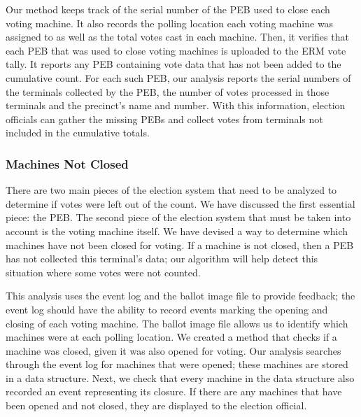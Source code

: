 Our method keeps track of the serial number of the PEB used to close each voting machine. It also records the polling location each voting machine was assigned to as well as the total votes cast in each machine. Then,  it verifies that each PEB that was used to close voting machines is uploaded to the ERM vote tally. It reports any PEB containing vote data that has not been added to the cumulative count.  For each such PEB, our analysis reports the serial numbers of the terminals collected by the PEB, the number of votes processed in those terminals and the precinct's name and number. With this information, election officials can gather the missing PEBs and collect votes from terminals not included in the cumulative totals.

\subsubsection{Machines Not Closed}
There are two main pieces of the election system that need to be analyzed to determine if votes were left out of the count.  We have discussed the first essential piece: the PEB.  The second piece of the election system that must be taken into account is the voting machine itself.   We have devised a way to determine which machines have not been closed for voting.  If a machine is not closed, then a PEB has not collected this terminal's data; our algorithm will help detect this situation where some votes were not counted.  

This analysis uses the event log and the ballot image file to provide feedback; the event log should have the ability to record events marking the opening and closing of each voting machine.  The ballot image file allows us to identify which machines were at each polling location.  We created a method that checks if a machine was closed, given it was also opened for voting.  Our analysis searches through the event log for machines that were opened; these machines are stored in a data structure.  Next, we check that every machine in the data structure also recorded an event representing its closure.  If there are any machines that have been opened and not closed, they are displayed to the election official.   
